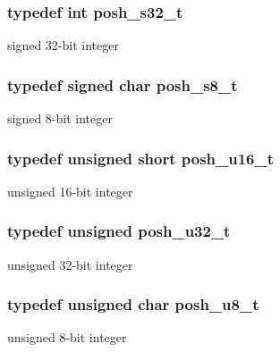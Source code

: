 \subsubsection[{\texorpdfstring{posh\+\_\+s32\+\_\+t}{posh_s32_t}}]{\setlength{\rightskip}{0pt plus 5cm}typedef int {\bf posh\+\_\+s32\+\_\+t}}\hypertarget{group__PoshTypes_gaa13412fdeac2c495d0e0278bd28ac8cb}{}\label{group__PoshTypes_gaa13412fdeac2c495d0e0278bd28ac8cb}
signed 32-\/bit integer 
\subsubsection[{\texorpdfstring{posh\+\_\+s8\+\_\+t}{posh_s8_t}}]{\setlength{\rightskip}{0pt plus 5cm}typedef signed char {\bf posh\+\_\+s8\+\_\+t}}\hypertarget{group__PoshTypes_gaded1f017e9a4317ae12199921b77a39e}{}\label{group__PoshTypes_gaded1f017e9a4317ae12199921b77a39e}
signed 8-\/bit integer 
\subsubsection[{\texorpdfstring{posh\+\_\+u16\+\_\+t}{posh_u16_t}}]{\setlength{\rightskip}{0pt plus 5cm}typedef unsigned short {\bf posh\+\_\+u16\+\_\+t}}\hypertarget{group__PoshTypes_ga8ef2f2264276677d018795b0ff67d486}{}\label{group__PoshTypes_ga8ef2f2264276677d018795b0ff67d486}
unsigned 16-\/bit integer 
\subsubsection[{\texorpdfstring{posh\+\_\+u32\+\_\+t}{posh_u32_t}}]{\setlength{\rightskip}{0pt plus 5cm}typedef unsigned {\bf posh\+\_\+u32\+\_\+t}}\hypertarget{group__PoshTypes_ga020bf929bf912667f0fa4312d816c2e0}{}\label{group__PoshTypes_ga020bf929bf912667f0fa4312d816c2e0}
unsigned 32-\/bit integer 
\subsubsection[{\texorpdfstring{posh\+\_\+u8\+\_\+t}{posh_u8_t}}]{\setlength{\rightskip}{0pt plus 5cm}typedef unsigned char {\bf posh\+\_\+u8\+\_\+t}}\hypertarget{group__PoshTypes_ga6c9edb76b9a22de1ce694739649d17ea}{}\label{group__PoshTypes_ga6c9edb76b9a22de1ce694739649d17ea}
unsigned 8-\/bit integer 